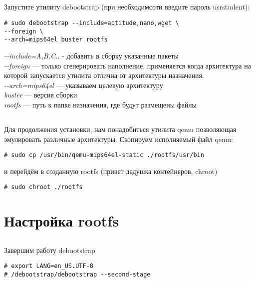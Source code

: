 \subsection{} Запустите утилиту debootstrap (при необходимсоти введите пароль usrstudent):
\begin{lstlisting}
# sudo debootstrap --include=aptitude,nano,wget \
--foreign \
--arch=mips64el buster rootfs
\end{lstlisting}
\textit{-{}-include=A,B,C..} - добавить в сборку указанные пакеты \\
\textit{-{}-foreign} — только сгенерировать наполнение, применяется когда архитектура на которой запускается утилита отлична от архитектуры назначения. \\
\textit{-{}-arch=mips64el} — указываем целевую архитектуру \\
\textit{buster} — версия сборки \\
\textit{rootfs} — путь к папке назначения, где будут размещены файлы \\

\subsection{} Для продолжения установки, нам понадобиться утилита qemu позволяющая эмулировать различные архитектуры. Скопируем исполняемый файл qemu:
\begin{lstlisting}
# sudo cp /usr/bin/qemu-mips64el-static ./rootfs/usr/bin
\end{lstlisting}
и перейдём в созданную rootfs (привет дедушка контейнеров, chroot)
\begin{lstlisting}
# sudo chroot ./rootfs
\end{lstlisting}

\section{Настройка rootfs}

\subsection{} Завершим работу debootstrap
\begin{lstlisting}
# export LANG=en_US.UTF-8
# /debootstrap/debootstrap --second-stage
\end{lstlisting}

